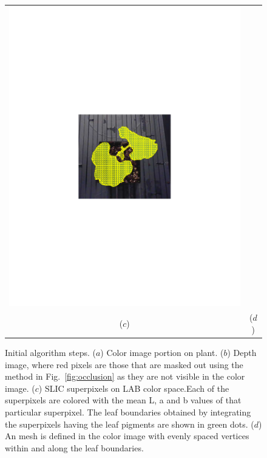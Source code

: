 \begin{figure}
\begin{center}
\begin{tabular}{cc}
\includegraphics[trim=190 280 190 290,clip,width=0.47\linewidth]{Figures/beanColorMesh} \\
($c$) & ($d$) \\
\end{tabular}
\end{center}
\caption{Initial algorithm steps.  ($a$) Color image portion on plant.  ($b$) Depth image, where red pixels are those that are masked out using the method in Fig.~\ref{fig:occlusion} as they are not visible in the color image. ($c$) SLIC superpixels on LAB color space.Each of the superpixels are colored with the mean L, a and b values of that particular superpixel. The leaf boundaries obtained by integrating the superpixels having the leaf pigments are shown in green dots. ($d$) An mesh is defined in the color image with evenly spaced vertices within and along the leaf boundaries. }
\label{fig:beanimageprocess}
\end{figure}

